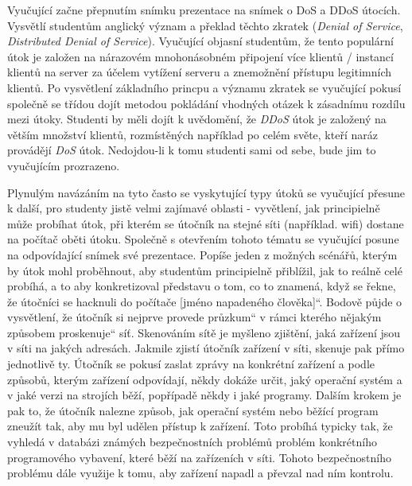 \documentclass[a4paper, 12pt]{article}
\providecommand{\uv}[1]{\quotedblbase #1\textquotedblleft}
\begin{document}
Vyučující začne přepnutím snímku prezentace na snímek o DoS a DDoS útocích. Vysvětlí studentům anglický význam a překlad těchto zkratek (\textit{Denial of Service}, \textit{Distributed Denial of Service}). Vyučující objasní studentům, že tento populární útok je založen na nárazovém mnohonásobném připojení více klientů / instancí klientů na server za účelem vytížení serveru a znemožnění přístupu legitimních klientů. Po vysvětlení základního princpu a významu zkratek se vyučující pokusí společně se třídou dojít metodou pokládání vhodných otázek k zásadnímu rozdílu mezi útoky. Studenti by měli dojít k uvědomění, že \textit{DDoS} útok je založený na větším množství klientů, rozmístěných například po celém světe, kteří naráz provádějí \textit{DoS} útok. Nedojdou-li k tomu studenti sami od sebe, bude jim to vyučujícím prozrazeno.

Plynulým navázáním na tyto často se vyskytující typy útoků se vyučující přesune k další, pro studenty jistě velmi zajímavé oblasti - vyvětlení, jak principielně může probíhat útok, při kterém se útočník na stejné síti (například. wifi) dostane na počítač oběti útoku. Společně s otevřením tohoto tématu se vyučující posune na odpovídající snímek své prezentace. Popíše jeden z možných scénářů, kterým by útok mohl proběhnout, aby studentům principielně přiblížil, jak to reálně celé probíhá, a to aby konkretizoval představu o tom, co to znamená, když se řekne, že \uv{útočníci se hacknuli do počítače [jméno napadeného člověka]}. Bodově půjde o vysvětlení, že útočník si nejprve provede \uv{průzkum} v rámci kterého nějakým způsobem \uv{proskenuje} síť. Skenováním sítě je myšleno zjištění, jaká zařízení jsou v síti na jakých adresách. Jakmile zjistí útočník zařízení v síti, skenuje pak přímo jednotlivě ty. Útočník se pokusí zaslat zprávy na konkrétní zařízení a podle způsobů, kterým zařízení odpovídají, někdy dokáže určit, jaký operační systém a v jaké verzi na strojích běží, popřípadě někdy i jaké programy. Dalším krokem je pak to, že útočník nalezne způsob, jak operační systém nebo běžící program zneužít tak, aby mu byl udělen přístup k zařízení. Toto probíhá typicky tak, že vyhledá v databázi známých bezpečnostních problémů problém konkrétního programového vybavení, které běží na zařízeních v síti. Tohoto bezpečnostního problému dále využije k tomu, aby zařízení napadl a převzal nad ním kontrolu.
\end{document}
